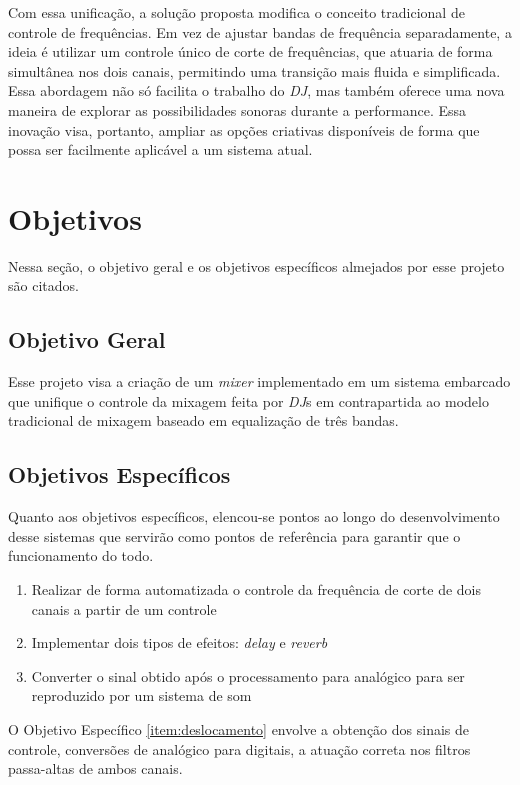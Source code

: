 Com essa unificação, a solução proposta modifica o conceito tradicional de controle de frequências. Em vez de ajustar bandas de frequência separadamente, a ideia é utilizar um controle único de corte de frequências, que atuaria de forma simultânea nos dois canais, permitindo uma transição mais fluida e simplificada. Essa abordagem não só facilita o trabalho do \textit{DJ}, mas também oferece uma nova maneira de explorar as possibilidades sonoras durante a performance. Essa inovação visa, portanto, ampliar as opções criativas disponíveis de forma que possa ser facilmente aplicável a um sistema atual. 

\section{Objetivos}

Nessa seção, o objetivo geral e os objetivos específicos almejados por esse projeto são citados.

\subsection{Objetivo Geral}
Esse projeto visa a criação de um \textit{mixer} implementado em um sistema embarcado que unifique o controle da mixagem feita por \textit{DJ}s em contrapartida ao modelo tradicional de mixagem baseado em equalização de três bandas.

\subsection{Objetivos Específicos}

Quanto aos objetivos específicos, elencou-se pontos ao longo do desenvolvimento desse sistemas que servirão como pontos de referência para garantir que o funcionamento do todo. 

\begin{enumerate}
    \item \label{item:deslocamento} Realizar de forma automatizada o controle da frequência de corte de dois canais a partir de um controle
    \item \label{item:efeitos} Implementar dois tipos de efeitos: \textit{delay} e \textit{reverb}
    \item \label{item:conversao} Converter o sinal obtido após o processamento para analógico para ser reproduzido por um sistema de som
\end{enumerate}

O Objetivo Específico \ref{item:deslocamento} envolve a obtenção dos sinais de controle, conversões de analógico para digitais, a atuação correta nos filtros passa-altas de ambos canais.

